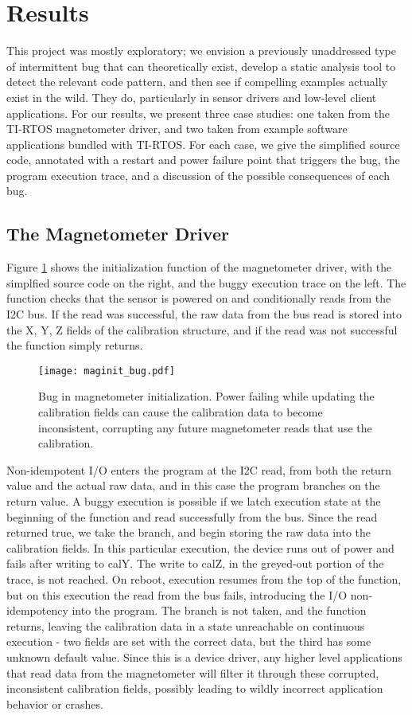 \section{Results}
This project was mostly exploratory; we envision a previously unaddressed type of intermittent bug that can theoretically exist, develop a static analysis tool to detect the relevant code pattern, and then see if compelling examples actually exist in the wild. They do, particularly in sensor drivers and low-level client applications. For our results, we present three case studies: one taken from the TI-RTOS magnetometer driver, and two taken from example software applications bundled with TI-RTOS. For each case, we give the simplified source code, annotated with a restart and power failure point that triggers the bug, the program execution trace, and a discussion of the possible consequences of each bug.

\subsection{The Magnetometer Driver}

Figure \ref{fig:mag} shows the initialization function of the magnetometer driver, with the simplfied source code on the right, and the buggy execution trace on the left. The function checks that the sensor is powered on and conditionally reads from the I2C bus. If the read was successful, the raw data from the bus read is stored into the X, Y, Z fields of the calibration structure, and if the read was not successful the function simply returns. 
\begin{figure}[h]
\centering
\texttt{[image: maginit\_bug.pdf]}
\caption{Bug in magnetometer initialization. Power failing while updating the calibration fields can cause the calibration data to become inconsistent, corrupting any future magnetometer reads that use the calibration.}
\label{fig:mag}
\end{figure}

Non-idempotent I/O enters the program at the I2C read, from both the return value and the actual raw data, and in this case the program branches on the return value. A buggy execution is possible if we latch execution state at the beginning of the function and read successfully from the bus. Since the read returned true, we take the branch, and begin storing the raw data into the calibration fields. In this particular execution, the device runs out of power and fails after writing to calY. The write to calZ, in the greyed-out portion of the trace, is not reached. On reboot, execution resumes from the top of the function, but on this execution the read from the bus fails, introducing the I/O non-idempotency into the program. The branch is not taken, and the function returns, leaving the calibration data in a state unreachable on continuous execution - two fields are set with the correct data, but the third has some unknown default value. 
Since this is a device driver, any higher level applications that read data from the magnetometer will filter it through these corrupted, inconsistent calibration fields, possibly leading to wildly incorrect application behavior or crashes.  

